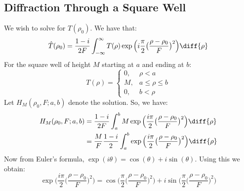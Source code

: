 \documentclass[crop=false,class=book,oneside]{standalone}
\begin{document}
        \subsection{Diffraction Through a Square Well}
            \label{Subsec:Cassini_Math_Diffraction_Through_a_Square_well}
            We wish to solve for $\hat{T}(\rho_{0})$. We have that:
            \begin{equation}
                \hat{T}(\rho_{0})
                =\frac{1-i}{2F}
                    \int_{-\infty}^{\infty}T(\rho)
                    \exp\Big(i\frac{\pi}{2}
                        \big(\frac{\rho-\rho_{0}}{F}\big)^{2}\Big)
                    \diff{\rho}
            \end{equation}
            For the square well of height $M$
            starting at $a$ and ending at $b$:
            \begin{equation}
                T(\rho)=
                \begin{cases}
                    0,&\rho<a\\
                    M,&a\leq\rho\leq{b}\\
                    0,&b<\rho
                \end{cases}
            \end{equation}
            Let $H_{M}(\rho_0,F;a,b)$ denote the solution.
            So, we have:
            \begin{subequations}
                \begin{align}
                    H_{M}(\rho_0,F;a,b)
                    &=\frac{1-i}{2F}\int_{a}^{b}M
                        \exp\Big(
                            \frac{i\pi}{2}
                            \big(\frac{\rho-\rho_{0}}{F}\big)^{2}
                        \Big)\diff{\rho}\\
                    &=\frac{M}{F}\frac{1-i}{2}
                        \int_{a}^{b}
                        \exp\Big(
                            \frac{i\pi}{2}
                            \big(\frac{\rho-\rho_{0}}{F}\big)^{2}
                        \Big)\diff{\rho}
                \end{align}
            \end{subequations}
            Now from Euler's formula,
            $\exp(i\theta)=\cos(\theta)+i\sin(\theta).$
            Using this we obtain:
            \begin{equation}
                \exp\Big(
                    \frac{i\pi}{2}
                    \big(\frac{\rho-\rho_{0}}{F}\big)^{2}
                \Big)
                =\cos\Big(
                    \frac{\pi}{2}
                    \big(\frac{\rho-\rho_{0}}{F}\big)^{2}
                \Big)+
                i\sin\Big(
                    \frac{\pi}{2}
                    \big(\frac{\rho-\rho_{0}}{F}\big)^{2}
                \Big)
            \end{equation}
\end{document}
